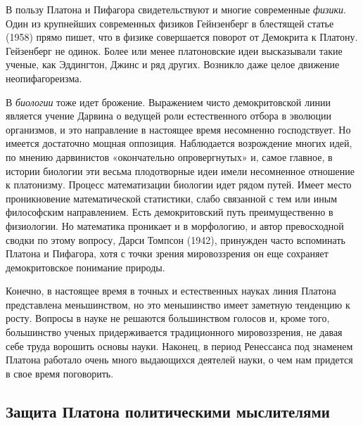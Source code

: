 В  пользу  Платона и  Пифагора  свидетельствуют  и многие  современные
\textit{физики}. Один из крупнейших  современных физиков Гейнзенберг в
блестящей статье (1958) прямо пишет,  что в физике совершается поворот
от  Демокрита  к  Платону.  Гейзенберг  не  одинок.  Более  или  менее
платоновские идеи высказывали такие ученые, как Эддингтон, Джинс и ряд
других. Возникло даже целое движение неопифагореизма.

В   \textit{биологии}    тоже   идет   брожение.    Выражением   чисто
демокритовской   линии  является   учение  Дарвина   о  ведущей   роли
естественного  отбора  в  эволюции  организмов, и  это  направление  в
настоящее  время   несомненно  господствует.  Но   имеется  достаточно
мощная  оппозиция.  Наблюдается  возрождение многих  идей,  по  мнению
дарвинистов «окончательно  опровергнутых» и, самое главное,  в истории
биологии эти  весьма плодотворные  идеи имели несомненное  отношение к
платонизму.  Процесс математизации  биологии идет  рядом путей.  Имеет
место  проникновение  математической  статистики,  слабо  связанной  с
тем  или  иным  философским  направлением.  Есть  демокритовский  путь
преимущественно в физиологии. Но  математика проникает и в морфологию,
и автор  превосходной сводки по  этому вопросу, Дарси  Томпсон (1942),
принужден часто  вспоминать Платона  и Пифагора,  хотя с  точки зрения
мировоззрения он еще сохраняет демокритовское понимание природы.

Конечно,  в  настоящее время  в  точных  и естественных  науках  линия
Платона представлена  меньшинством, но это меньшинство  имеет заметную
тенденцию к  росту. Вопросы в  науке не решаются  большинством голосов
и,  кроме   того,  большинство  ученых   придерживается  традиционного
мировоззрения, не давая  себе труда ворошить основы  науки. Наконец, в
период Ренессанса под знаменем Платона работало очень много выдающихся
деятелей науки, о чем нам придется в свое время поговорить.

\subsection{Защита Платона политическими мыслителями}

